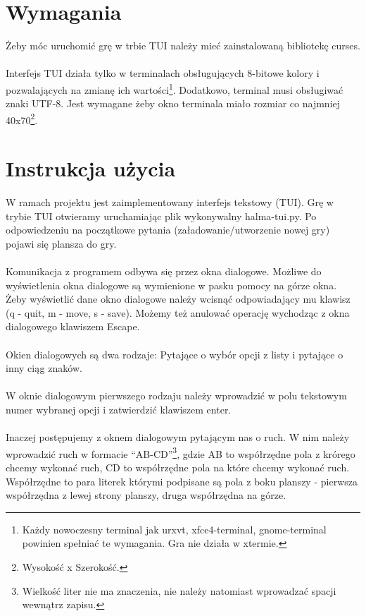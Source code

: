 \documentclass[12pt, titlepage]{article}
\begin{document}
\pagebreak
\section{Wymagania}
Żeby móc uruchomić grę w trbie TUI należy mieć zainstalowaną
bibliotekę curses.
\\~\\
Interfejs TUI działa tylko w terminalach obsługujących 8-bitowe
kolory i pozwalających na zmianę ich wartości\footnote{Każdy nowoczesny terminal jak urxvt, xfce4-terminal, gnome-terminal powinien spełniać te wymagania. Gra nie działa w xtermie.}.
Dodatkowo, terminal musi obsługiwać znaki UTF-8.
Jest wymagane żeby okno terminala miało rozmiar co
najmniej 40x70\footnote{Wysokość x Szerokość.}.

\section{Instrukcja użycia}
W ramach projektu jest zaimplementowany interfejs tekstowy (TUI).
Grę w trybie TUI otwieramy uruchamiając plik wykonywalny
halma-tui.py. Po odpowiedzeniu na początkowe pytania
(załadowanie/utworzenie nowej gry) pojawi się plansza do gry.
\\~\\
Komunikacja z programem odbywa się przez okna dialogowe.
Możliwe do wyświetlenia okna dialogowe są wymienione
w pasku pomocy na górze okna. Żeby wyświetlić dane okno
dialogowe należy wcisnąć odpowiadający mu klawisz (q - quit,
m - move, s - save). Możemy też anulować operację wychodząc
z okna dialogowego klawiszem Escape.
\\~\\
Okien dialogowych są dwa rodzaje: Pytające o wybór opcji z listy i
pytające o inny ciąg znaków.
\\~\\
W oknie dialogowym pierwszego rodzaju należy wprowadzić w
polu tekstowym numer wybranej opcji i zatwierdzić
klawiszem enter.
\\~\\
Inaczej postępujemy z oknem dialogowym pytającym nas o ruch.
W nim należy wprowadzić ruch w formacie "`AB-CD"'\footnote{Wielkość liter nie ma znaczenia, nie należy natomiast wprowadzać spacji wewnątrz zapisu.}, gdzie AB
to współrzędne pola z krórego chcemy wykonać ruch, CD to
współrzędne pola na które chcemy wykonać ruch. Współrzędne
to para literek którymi podpisane są pola z boku planszy -
pierwsza współrzędna z lewej strony planszy, druga współrzędna
na górze.
\end{document}

